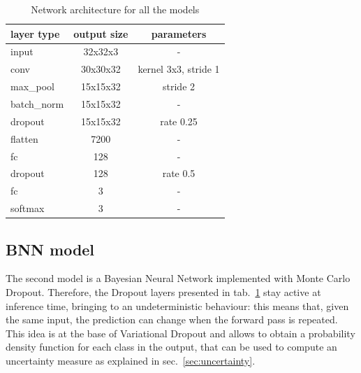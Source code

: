 \documentclass[11pt,twoside,a4paper]{article}
\begin{document}
\begin{table}[!h]
  \begin{adjustwidth}{-.5in}{-.5in}
  \begin{center}
    \begin{tabular}{l | c | c }
      layer type 	& output size	& parameters \\
      \hline
      input		& 32x32x3	& - \\
      conv		& 30x30x32 	& kernel 3x3, stride 1 \\
      max\_pool		& 15x15x32	& stride 2  \\
      batch\_norm 	& 15x15x32 	& - \\
      dropout		& 15x15x32	& rate 0.25 \\	
      flatten		& 7200		& - \\	
      fc		& 128		& - \\	
      dropout		& 128		& rate 0.5 \\
      fc		& 3		& - \\
      softmax		& 3		& - \\
    \end{tabular}
    \caption{Network architecture for all the models}
    \label{tab:arch}
  \end{center}
  \end{adjustwidth}
\end{table}


\subsection{BNN model}
\label{sec:bnn_model}
The second model is a Bayesian Neural Network implemented with Monte Carlo Dropout. Therefore, the Dropout layers presented in tab.~\ref{tab:arch} stay active at inference time, bringing to an undeterministic behaviour: this means that, given the same input, the prediction can change when the forward pass is repeated. This idea is at the base of Variational Dropout and allows to obtain a probability density function for each class in the output, that can be used to compute an uncertainty measure as explained in sec.~\ref{sec:uncertainty}.
\end{document}
